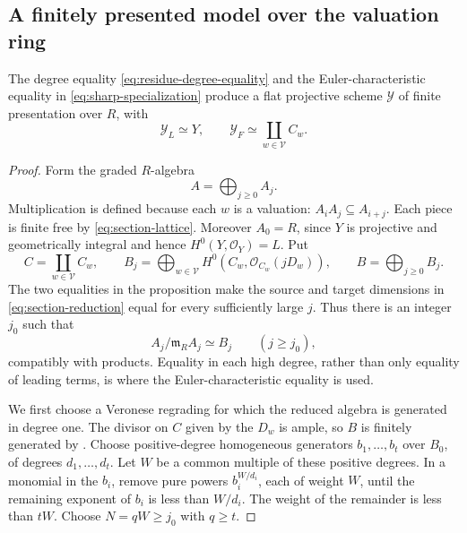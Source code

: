 \subsection{A finitely presented model over the valuation ring}

\begin{proposition}\label{prop:specialization-model}
The degree equality \eqref{eq:residue-degree-equality} and the
Euler-characteristic equality in \eqref{eq:sharp-specialization}
produce a flat projective scheme $\mathcal Y$ of finite presentation
over $R$, with
\[
 \mathcal Y_L\simeq Y,\qquad
 \mathcal Y_F\simeq\coprod_{w\in\mathcal V}C_w.
\]
\end{proposition}

\begin{proof}
Form the graded $R$-algebra
\[
 A=\bigoplus_{j\geq0}A_j.
\]
Multiplication is defined because each $w$ is a valuation:
$A_iA_j\subseteq A_{i+j}$. Each piece is finite free by
\eqref{eq:section-lattice}. Moreover $A_0=R$, since $Y$ is projective
and geometrically integral and hence $H^0(Y,\mathcal O_Y)=L$.
Put
\[
 C=\coprod_{w\in\mathcal V}C_w,
 \qquad B_j=\bigoplus_{w\in\mathcal V}
 H^0(C_w,\mathcal O_{C_w}(jD_w)),
 \qquad B=\bigoplus_{j\geq0}B_j.
\]
The two equalities in the proposition make the source and target
dimensions in \eqref{eq:section-reduction} equal for every sufficiently
large $j$. Thus there is an integer $j_0$ such that
\begin{equation}\label{eq:full-high-degree-reduction}
 A_j/\mathfrak m_R A_j\simeq B_j
 \qquad(j\geq j_0),
\end{equation}
compatibly with products. Equality in each high degree, rather than
only equality of leading terms, is where the Euler-characteristic
equality is used.

We first choose a Veronese regrading for which the reduced algebra is
generated in degree one. The divisor on $C$ given by the $D_w$ is ample,
so $B$ is finitely generated by . Choose
positive-degree homogeneous generators $b_1,\ldots,b_t$ over $B_0$,
of degrees $d_1,\ldots,d_t$. Let $W$ be a common multiple of these
positive degrees. In a monomial in the $b_i$, remove pure powers
$b_i^{W/d_i}$, each of weight $W$, until the remaining exponent of
$b_i$ is less than $W/d_i$. The weight of the remainder is less than
$tW$. Choose $N=qW\geq j_0$ with $q\geq t$.


\end{proof}

